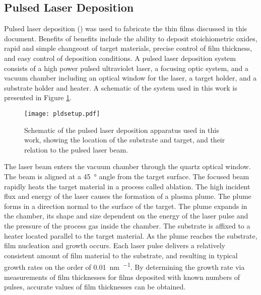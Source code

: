 \subsection{Pulsed Laser Deposition}
\label{subsec:exp.pld}


Pulsed laser deposition () was used to fabricate the thin films discussed in this document. Benefits of  benefits include the ability to deposit stoichiometric oxides, rapid and simple changeout of target materials, precise control of film thickness, and easy control of deposition conditions.\cite{Chrisey:1994ta} A pulsed laser deposition system consists of a high power pulsed ultraviolet laser, a focusing optic system, and a vacuum chamber including an optical window for the laser, a target holder, and a substrate holder and heater. A schematic of the system used in this work is presented in Figure \ref{fig:pldsetup}.
\begin{figure}[b]
	\texttt{[image: pldsetup.pdf]}
	\caption[Schematic of pulsed laser deposition apparatus]{%
		Schematic of the pulsed laser deposition apparatus used in 
		this work, showing the location of the substrate and target, 
		and their relation to the pulsed laser beam.}
	\label{fig:pldsetup}
\end{figure}
The laser  beam enters the vacuum chamber through the quartz optical window. The beam is aligned at a \SI{45}{\degree} angle from the target surface. The focused beam rapidly heats the target material in a process called ablation. The high incident flux and energy of the laser causes the formation of a plasma plume. The plume forms in a direction normal to the surface of the target. The plume expands in the chamber, its shape and size dependent on the energy of the laser pulse and the pressure of the process gas inside the chamber. The substrate is affixed to a heater located parallel to the target material. As the plume reaches the substrate, film nucleation and growth occurs. Each laser pulse delivers a relatively consistent amount of film material to the substrate, and resulting in typical growth rates on the order of \SI{0.01}{\nano\meter\per\pulse}. By determining the growth rate via measurements of film thicknesses for films deposited with known numbers of pulses, accurate values of film thicknesses can be obtained.

